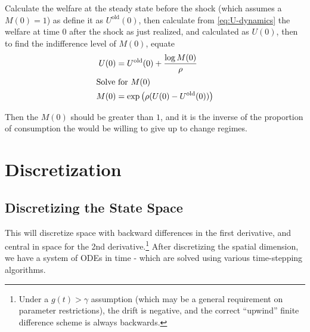 \documentclass[11pt]{article}
\begin{document}
Calculate the welfare at the steady state before the shock (which assumes a $M(0) = 1$) as define it as $U^{\text{old}}(0)$, then calculate from \cref{eq:U-dynamics} the welfare at time $0$ after the shock as just realized, and calculated as $U(0)$, then to find the indifference level of $M(0)$, equate
\begin{align}
	U(0) &= U^{\text{old}}(0)  + \frac{\log M(0)}{\rho}\\
	\intertext{Solve for $M(0)$}
	M(0) &= \exp \left(\rho(U(0) - U^{\text{old}}(0))\right)
\end{align}

Then the $M(0)$ should be greater than $1$, and it is the inverse of the proportion of consumption the would be willing to give up to change regimes.


\section{Discretization}\label{sec:discretization}
\subsection{Discretizing the State Space}\label{eq:discretization}
This will discretize space with backward differences in the first derivative, and central in space for the 2nd derivative.\footnote{Under a $g(t) > \gamma$ assumption (which may be a general requirement on parameter restrictions), the drift is negative, and the correct ``upwind'' finite difference scheme is always backwards.}  After discretizing the spatial dimension, we have a system of ODEs in time - which are solved using various time-stepping algorithms.
\end{document}
